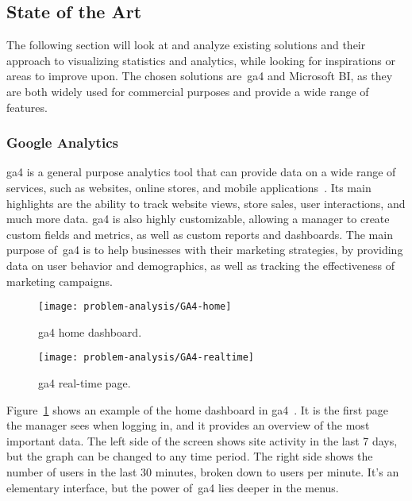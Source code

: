 \subsection{State of the Art}\label{subsec:state-of-the-art}

The following section will look at and analyze existing solutions and their approach to visualizing statistics and
analytics, while looking for inspirations or areas to improve upon.
The chosen solutions are~\acrlong{ga4} and Microsoft BI, as they are both widely used for commercial purposes and
provide a wide range of features.

\subsubsection{Google Analytics}\label{subsubsec:google-analytics}

\acrfull{ga4} is a general purpose analytics tool that can provide data on a wide range of services, such as websites,
online stores, and mobile applications~\cite{ga4}.
Its main highlights are the ability to track website views, store sales, user interactions, and much more data.
\acrshort{ga4} is also highly customizable, allowing a manager to create custom fields and metrics, as well as custom
reports and dashboards.
The main purpose of~\acrshort{ga4} is to help businesses with their marketing strategies, by providing data on user
behavior and demographics, as well as tracking the effectiveness of marketing campaigns.

\begin{figure}[H]
    \centering
    \texttt{[image: problem-analysis/GA4-home]}
    \caption{\acrshort{ga4} home dashboard.}\label{fig:GA4-dashboard}
\end{figure}

\begin{figure}[H]
    \centering
    \texttt{[image: problem-analysis/GA4-realtime]}
    \caption{\acrshort{ga4} real-time page.}\label{fig:GA4-realtime}
\end{figure}

Figure~\ref{fig:GA4-dashboard} shows an example of the home dashboard in \acrshort{ga4}~\cite{ga4-interface}.
It is the first page the manager sees when logging in, and it provides an overview of the most important data.
The left side of the screen shows site activity in the last 7 days, but the graph can be changed to any time period.
The right side shows the number of users in the last 30 minutes, broken down to users per minute.
It's an elementary interface, but the power of~\acrshort{ga4} lies deeper in the menus.

